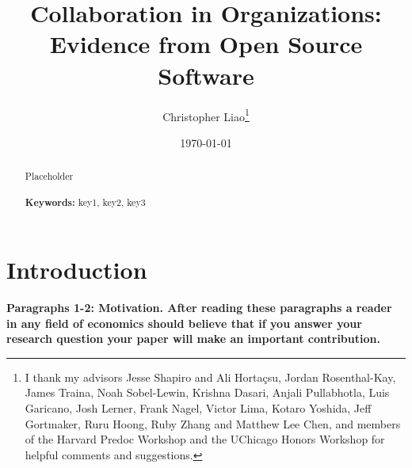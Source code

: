 \documentclass[12pt,notitlepage]{article}
\begin{document}
\begin{titlepage}
\title{Collaboration in Organizations: Evidence from Open Source Software}
\author{Christopher Liao\thanks{I thank my  advisors Jesse Shapiro and Ali Hortaçsu, Jordan Rosenthal-Kay, James Traina, Noah Sobel-Lewin, Krishna Dasari, Anjali Pullabhotla, Luis Garicano, Josh Lerner, Frank Nagel, Victor Lima, Kotaro Yoshida, Jeff Gortmaker, Ruru Hoong, Ruby Zhang and Matthew Lee Chen, and members of the Harvard Predoc Workshop and the UChicago Honors Workshop for helpful comments and suggestions.}}
\date{\today}
\maketitle

\begin{abstract}
\noindent Placeholder\\
\vspace{0in}\\
\noindent\textbf{Keywords:} key1, key2, key3\\

\bigskip
\end{abstract}
\setcounter{page}{0}
\thispagestyle{empty}
\end{titlepage}
\pagebreak \newpage

\section{Introduction} \label{sec:intro}

\textbf{Paragraphs 1-2: Motivation. After reading these paragraphs a reader in any field of economics should believe that if you answer your research question your paper will make an important contribution.}
\end{document}

